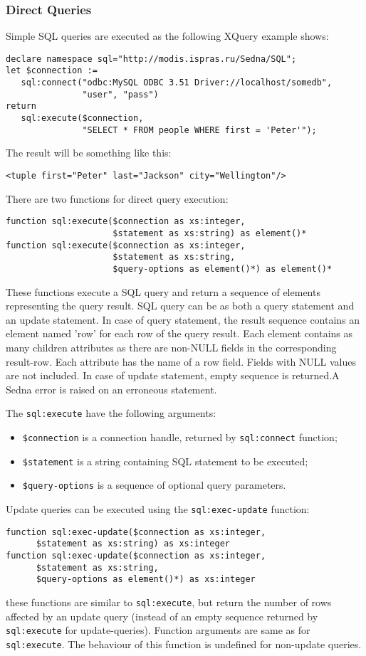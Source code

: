\documentclass[a4paper,12pt]{article}
\newenvironment{citemize}
{\begin{itemize}
  \setlength{\itemsep}{0pt}
  \setlength{\parskip}{0pt}
  \setlength{\parsep}{0pt}}
{\end{itemize}}
\begin{document}
\subsubsection*{Direct Queries}
Simple SQL queries are executed as the following XQuery example shows:
\small{
\begin{verbatim}
declare namespace sql="http://modis.ispras.ru/Sedna/SQL";
let $connection :=
   sql:connect("odbc:MySQL ODBC 3.51 Driver://localhost/somedb",
               "user", "pass")
return
   sql:execute($connection,
               "SELECT * FROM people WHERE first = 'Peter'");
\end{verbatim}}

The result will be something like this:
\small{
\begin{verbatim}
<tuple first="Peter" last="Jackson" city="Wellington"/>
\end{verbatim}}

There are two functions for direct query execution:
\begin{verbatim}
function sql:execute($connection as xs:integer,
                     $statement as xs:string) as element()*
function sql:execute($connection as xs:integer,
                     $statement as xs:string,
                     $query-options as element()*) as element()*
\end{verbatim}
These functions execute a SQL query and return a sequence of elements
representing the query result. SQL query can be as both a query statement and an
update statement. In case of query statement, the result sequence contains an
element named 'row' for each row of the query result. Each element contains as
many children attributes as there are non-NULL fields in the corresponding
result-row. Each attribute has the name of a row field. Fields with NULL values
are not included. In case of update statement, empty sequence is returned.A
Sedna error is raised on an erroneous statement.

The \verb!sql:execute! have the following arguments:
\begin{citemize}
\item\verb!$connection! is a connection handle, returned by \verb!sql:connect!
function;
\item\verb!$statement! is a string containing SQL statement to be executed;
\item\verb!$query-options! is a sequence of optional query parameters.
\end{citemize}

Update queries can be executed using the \verb!sql:exec-update! function:
\begin{verbatim}
function sql:exec-update($connection as xs:integer,
      $statement as xs:string) as xs:integer
function sql:exec-update($connection as xs:integer,
      $statement as xs:string,
      $query-options as element()*) as xs:integer
\end{verbatim}
these functions are similar to \verb!sql:execute!, but return the number of rows
affected by an update query (instead of an empty sequence returned by
\verb!sql:execute! for update-queries). Function arguments are same as for
\verb!sql:execute!. The behaviour of this function is undefined for non-update
queries.
\end{document}
